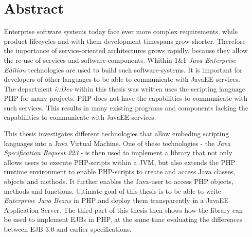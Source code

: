 
\chapter{Abstract}

Enterprise software systems today face ever more complex requirements, while product
lifecycles and with them development timespans grow shorter. Therefore the importance of
service-oriented architectures grows rapidly, because they allow the re-use of services and
software-components. Whithin 1\&1 \emph{Java Enterprise Edition} technologies are used to
build such software-systems. It is important for developers of other languages to be able
to communicate with JavaEE-services. The department \emph{i::Dev} within this thesis was
written uses the scripting language PHP for many projects. PHP does not have the capabilities
to communicate with such services. This results in many existing programs and components lacking
the capablilities to communicate with JavaEE-services. 

This thesis investigates different technologies that allow embeding scripting languages into
a Java Virtual Machine. One of these technologies - the \emph{Java Specification Request 223} - 
is then used to implement a library that not only allows users to execute PHP-scripts within a
JVM, but also extends the PHP runtime environment to enable PHP-scripts to create and access Java classes, 
objects and methods. It further enables the Java-user to access PHP objects, methods and functions.
Ultimate goal of this thesis is to be able to write \emph{Enterprise Java Beans} in PHP and deploy
them transparently in a JavaEE Application Server.
The third part of this thesis then shows how the library can be used to implement EJBs in PHP, at
the same time evaluating the differences between EJB 3.0 and earlier specifications.
